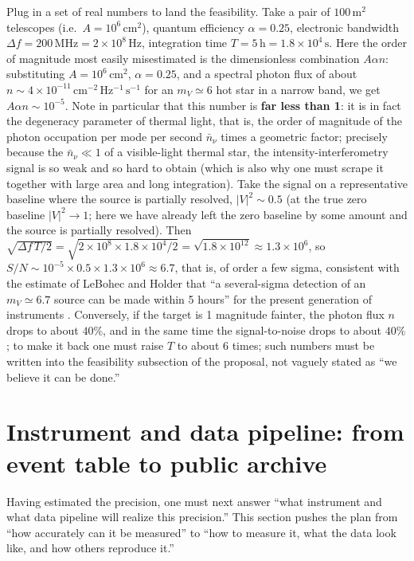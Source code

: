 Plug in a set of real numbers to land the feasibility. Take a pair of \(100\,\mathrm{m^2}\) telescopes (i.e.\ \(A=10^6\,\mathrm{cm^2}\)), quantum efficiency \(\alpha=0.25\), electronic bandwidth \(\Delta f=200\,\mathrm{MHz}=2\times10^8\,\mathrm{Hz}\), integration time \(T=5\,\mathrm{h}=1.8\times10^4\,\mathrm{s}\). Here the order of magnitude most easily misestimated is the dimensionless combination \(A\alpha n\): substituting \(A=10^6\,\mathrm{cm^2}\), \(\alpha=0.25\), and a spectral photon flux of about \(n\sim4\times10^{-11}\,\mathrm{cm^{-2}\,Hz^{-1}\,s^{-1}}\) for an \(m_V\simeq6\) hot star in a narrow band, we get \(A\alpha n\sim10^{-5}\). Note in particular that this number is \textbf{far less than 1}: it is in fact the degeneracy parameter of thermal light, that is, the order of magnitude of the photon occupation per mode per second \(\bar n_\nu\) times a geometric factor; precisely because the \(\bar n_\nu\ll1\) of a visible-light thermal star, the intensity-interferometry signal is so weak and so hard to obtain (which is also why one must scrape it together with large area and long integration). Take the signal on a representative baseline where the source is partially resolved, \(|V|^2\sim0.5\) (at the true zero baseline \(|V|^2\to1\); here we have already left the zero baseline by some amount and the source is partially resolved). Then \(\sqrt{\Delta f\,T/2}=\sqrt{2\times10^8\times1.8\times10^4/2}=\sqrt{1.8\times10^{12}}\approx1.3\times10^6\), so \(S/N\sim10^{-5}\times0.5\times1.3\times10^6\approx6.7\), that is, of order a few sigma, consistent with the estimate of LeBohec and Holder that ``a several-sigma detection of an \(m_V\simeq6.7\) source can be made within 5 hours'' for the present generation of instruments \citep{2006ApJ...649..399L,2013APh....43..331D}. Conversely, if the target is 1 magnitude fainter, the photon flux \(n\) drops to about \(40\%\), and in the same time the signal-to-noise drops to about \(40\%\); to make it back one must raise \(T\) to about \(6\) times; such numbers must be written into the feasibility subsection of the proposal, not vaguely stated as ``we believe it can be done.''

\section{Instrument and data pipeline: from event table to public archive}
\label{sec:e28-pipeline}

Having estimated the precision, one must next answer ``what instrument and what data pipeline will realize this precision.'' This section pushes the plan from ``how accurately can it be measured'' to ``how to measure it, what the data look like, and how others reproduce it.''

